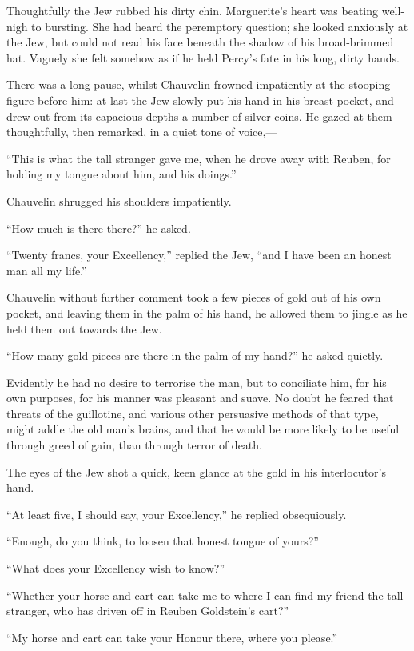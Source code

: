 Thoughtfully the Jew rubbed his dirty chin. Marguerite's heart was beating well-nigh to bursting. She had heard the peremptory question; she looked anxiously at the Jew, but could not read his face beneath the shadow of his broad-brimmed hat. Vaguely she felt somehow as if he held Percy's fate in his long, dirty hands.

There was a long pause, whilst Chauvelin frowned impatiently at the stooping figure before him: at last the Jew slowly put his hand in his breast pocket, and drew out from its capacious depths a number of silver coins. He gazed at them thoughtfully, then remarked, in a quiet tone of voice,---

\enquote{This is what the tall stranger gave me, when he drove away with Reuben, for holding my tongue about him, and his doings.}

Chauvelin shrugged his shoulders impatiently.

\enquote{How much is there there?} he asked.

\enquote{Twenty francs, your Excellency,} replied the Jew, \enquote{and I have been an honest man all my life.}

Chauvelin without further comment took a few pieces of gold out of his own pocket, and leaving them in the palm of his hand, he allowed them to jingle as he held them out towards the Jew.

\enquote{How many gold pieces are there in the palm of my hand?} he asked quietly.

Evidently he had no desire to terrorise the man, but to conciliate him, for his own purposes, for his manner was pleasant and suave. No doubt he feared that threats of the guillotine, and various other persuasive methods of that type, might addle the old man's brains, and that he would be more likely to be useful through greed of gain, than through terror of death.

The eyes of the Jew shot a quick, keen glance at the gold in his interlocutor's hand.

\enquote{At least five, I should say, your Excellency,} he replied obsequiously.

\enquote{Enough, do you think, to loosen that honest tongue of yours?}

\enquote{What does your Excellency wish to know?}

\enquote{Whether your horse and cart can take me to where I can find my friend the tall stranger, who has driven off in Reuben Goldstein's cart?}

\enquote{My horse and cart can take your Honour there, where you please.}

